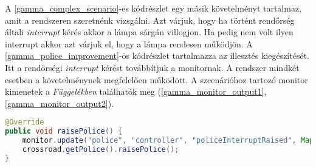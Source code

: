 A \ref{gamma_complex_scenario}-es kódrészlet egy másik követelményt tartalmaz, amit a rendszeren szeretnénk vizsgálni.
Azt várjuk, hogy ha történt rendőrség általi \textit{interrupt} kérés akkor a lámpa sárgán villogjon.
Ha pedig nem volt ilyen interrupt akkor azt várjuk el, hogy a lámpa rendesen működjön.
A \ref{gamma_police_improvement}-ös kódrészlet tartalmazza az illesztés kiegészítését.
Itt a rendörségi \textit{interrupt} kérést továbbítjuk a monitornak.
A rendszer mindkét esetben a követelménynek megfelelően működött.
A szcenárióhoz tartozó monitor kimenetek a \textit{Függelékben} találhatók meg (\ref{gamma_monitor_output1}, \ref{gamma_monitor_output2}).

\begin{lstlisting}[language=java, frame=single, float=ht!, caption={Gamma illesztéshez tartozó kódrészlet.},captionpos=b,label=gamma_police_improvement]
@Override
public void raisePolice() {
    monitor.update("police", "controller", "policeInterruptRaised", Map.of("success", true));
    crossroad.getPolice().raisePolice();
}
\end{lstlisting}